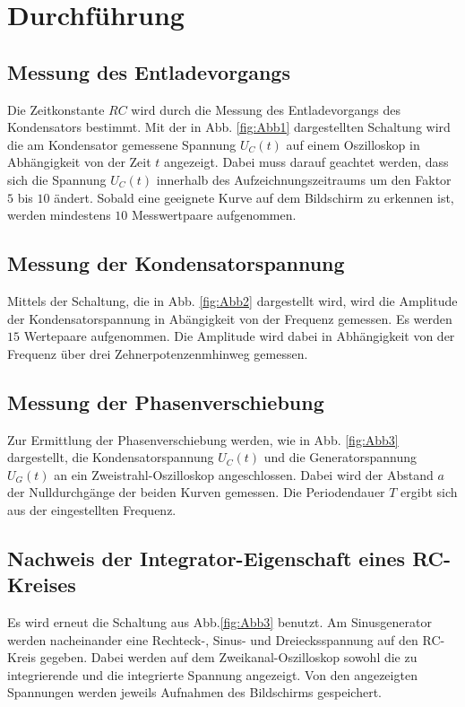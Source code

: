 \section{Durchführung}
\label{sec:Durchführung}

\subsection{Messung des Entladevorgangs}
Die Zeitkonstante $RC$ wird durch die Messung des Entladevorgangs des Kondensators bestimmt. 
Mit der in Abb. \ref{fig:Abb1} dargestellten Schaltung wird die am Kondensator gemessene Spannung $U_{C}(t)$ auf einem
Oszilloskop in Abhängigkeit von der Zeit $t$ angezeigt. Dabei muss darauf geachtet werden, dass sich die Spannung 
$U_{C}(t)$ innerhalb des Aufzeichnungszeitraums um den Faktor $5$ bis $10$ ändert. Sobald eine geeignete Kurve auf dem 
Bildschirm zu erkennen ist, werden mindestens $10$ Messwertpaare aufgenommen.

\subsection{Messung der Kondensatorspannung}
Mittels der Schaltung, die in Abb. \ref{fig:Abb2} dargestellt wird, wird die Amplitude der Kondensatorspannung in 
Abängigkeit von der Frequenz gemessen. Es werden $15$ Wertepaare aufgenommen.
Die Amplitude wird dabei in Abhängigkeit von der Frequenz über drei Zehnerpotenzenmhinweg gemessen.

\subsection{Messung der Phasenverschiebung}
Zur Ermittlung der Phasenverschiebung werden, wie in Abb. \ref{fig:Abb3} dargestellt, die Kondensatorspannung $U_{C}(t)$ 
und die Generatorspannung $U_{G}(t)$ an ein Zweistrahl-Oszilloskop angeschlossen. Dabei wird der Abstand $a$ der 
Nulldurchgänge der beiden Kurven gemessen. Die Periodendauer $T$ ergibt sich aus der eingestellten Frequenz.%

\subsection{Nachweis der Integrator-Eigenschaft eines RC-Kreises}
Es wird erneut die Schaltung aus Abb.\ref{fig:Abb3} benutzt. Am Sinusgenerator werden nacheinander eine Rechteck-, 
Sinus- und Dreiecksspannung auf den RC-Kreis gegeben. Dabei werden auf dem Zweikanal-Oszilloskop sowohl die 
zu integrierende und die integrierte Spannung angezeigt. Von den angezeigten Spannungen werden jeweils Aufnahmen
des Bildschirms gespeichert. 
